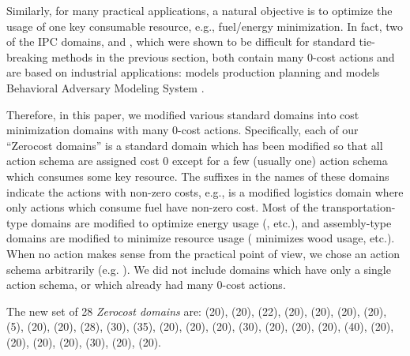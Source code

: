 Similarly, for many practical applications, a natural objective is to
optimize the usage of one key consumable resource, e.g., fuel/energy
minimization.  In fact, two of the IPC domains,  and
, which were shown to be difficult for standard tie-breaking
methods in the previous section, both contain many 0-cost actions
and are based on industrial applications: %
 models
production planning \cite{fink1999applications} and 
models Behavioral Adversary Modeling System \cite[minimizing decryption,
data transfer, etc.]{boddy2005course}.

Therefore, %
in this paper, we modified various standard domains
into cost minimization domains with many 0-cost actions.
Specifically, each of our ``Zerocost domains'' is a standard domain which has been modified so that all action schema are assigned
cost 0 except for a few (usually one) action schema which consumes some key resource.
The suffixes in the names of these domains indicate the actions with non-zero costs, 
e.g.,  is a modified logistics domain where only actions which consume fuel have non-zero cost.
Most of the transportation-type domains are modified to optimize 
energy usage (,  etc.), and  assembly-type domains are modified to minimize resource usage
( minimizes wood usage, etc.).
When no action makes sense from the practical point of view, we chose an action schema arbitrarily (e.g. ).
We did not
include domains which have only a single action schema, or which already had many 0-cost actions.

The new set of 28 \emph{Zerocost domains} are:
 (20),  (20),  (22),  (20),
 (20),  (20),  (20),  (5),
 (20),  (20),  (28),  (30),
 (35),  (20),  (20),
 (20),  (30),  (20),
 (20),  (20),  (40),
 (20),  (20),  (20),
 (20),  (30),  (20),
 (20).

